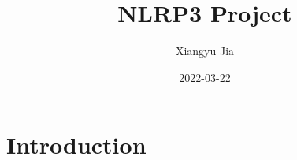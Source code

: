 \documentclass{article}
\title{NLRP3 Project}
\date{2022-03-22}
\author{Xiangyu Jia}
\begin{document}
\maketitle
\newpage
{}

\section{Introduction}
\end{document}
